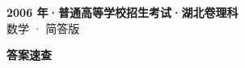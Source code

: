 \documentclass[zihao=-4, a4paper]{ctexart}
\begin{document}
\begin{center}
  {\Large\bfseries 2006 年·普通高等学校招生考试·湖北卷理科}\\[4pt]
  {\large 数学 · 简答版}
\end{center}
\medskip
{}

\clearpage
{}
\begin{center}{\Large\bfseries 答案速查}\end{center}
\medskip

\end{document}
